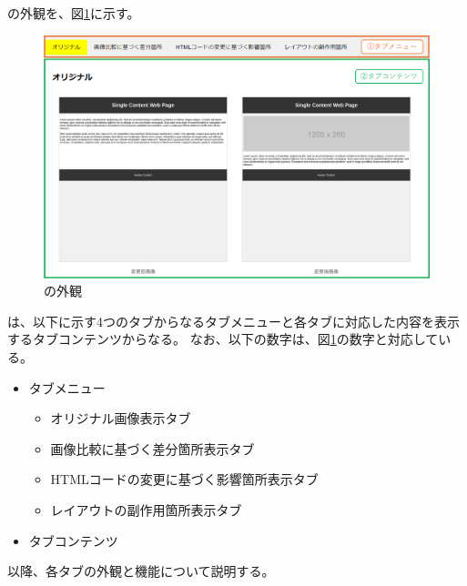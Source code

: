 \toolName の外観を、図\ref{fig: Appearance}に示す。
\begin{figure}[tp]
    \begin{center}
        \includegraphics[width=1.0\columnwidth]{image/3_Outline_Appearance.png}
        \caption{\toolName の外観}
        \label{fig: Appearance}
    \end{center}
\end{figure}
\toolName は、以下に示す4つのタブからなるタブメニューと各タブに対応した内容を表示するタブコンテンツからなる。
なお、以下の数字は、図\ref{fig: Appearance}の数字と対応している。
\begin{itemize}
    \item[①] タブメニュー
          \begin{itemize}
              \item オリジナル画像表示タブ
              \item 画像比較に基づく差分箇所表示タブ
              \item HTMLコードの変更に基づく影響箇所表示タブ
              \item レイアウトの副作用箇所表示タブ
          \end{itemize}
    \item[②] タブコンテンツ
\end{itemize}
\par
以降、各タブの外観と機能について説明する。



